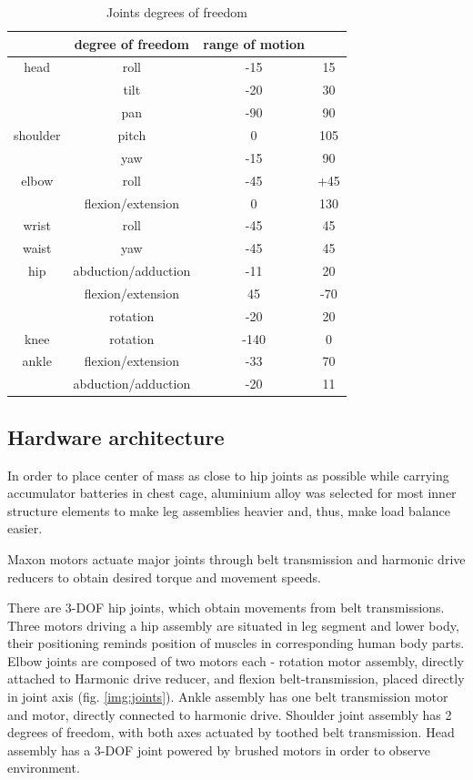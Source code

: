 \documentclass[letterpaper, 10 pt, conference]{ieeeconf}  %
\begin{document}
\begin{table}[thpb]
    \caption{Joints degrees of freedom}
    \label{tbl:DOFTable}
    \begin{center}
    \begin{tabular}{c | c c c}
        & degree of freedom & range of motion & \\
    \hline
        head & roll & -15 & 15 \\
            & tilt & -20 & 30 \\
            & pan & -90 & 90 \\
    \hline
        shoulder &  pitch & 0 & 105\\
                & yaw & -15 & 90\\
    \hline
        elbow & roll & -45 & +45 \\
                & flexion/extension & 0 & 130\\ 
    \hline
        wrist & roll & -45 & 45 \\
    \hline
        waist & yaw & -45 & 45 \\
    \hline
        hip & abduction/adduction & -11 & 20 \\
            & flexion/extension & 45 & -70 \\
            & rotation &-20 & 20\\
    \hline
        knee & rotation & -140 & 0 \\
    \hline
        ankle & flexion/extension & -33 & 70 \\
            & abduction/adduction & -20 & 11\\
    \end{tabular}
    \end{center}
\end{table}

\subsection{Hardware architecture}
In order to place center of mass as close to hip joints as possible while
carrying accumulator batteries in chest cage, aluminium alloy was selected for
most inner structure elements to make leg assemblies heavier and, thus, make
load balance easier.

Maxon motors actuate major joints through belt transmission and harmonic drive
reducers to obtain desired torque and movement speeds.



There are 3-DOF hip joints, which obtain movements from belt transmissions.
Three motors driving a hip assembly are situated in leg segment and lower body,
their positioning reminds position of muscles in corresponding human body
parts.
Elbow joints are composed of two motors each - rotation motor assembly, directly
attached to Harmonic drive reducer, and flexion belt-transmission, placed
directly in joint axis (fig. \ref{img:joints}).
Ankle assembly has one belt transmission motor and motor, directly connected
to harmonic drive.
Shoulder joint assembly has 2 degrees of freedom, with both axes actuated by
toothed belt transmission.
Head assembly has a 3-DOF joint powered by brushed
motors in order to observe environment.
\end{document}
